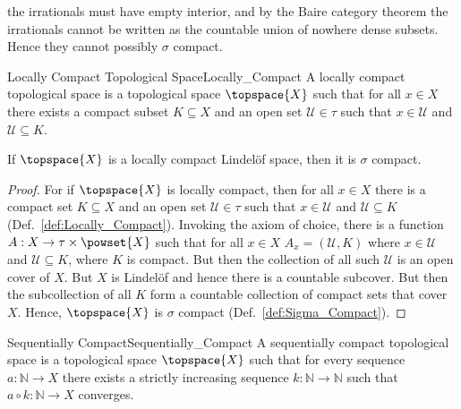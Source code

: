 \documentclass{article}                                                        %
\begin{document}
            the irrationals must have empty interior, and by the Baire category
            theorem the irrationals cannot be written as the countable union of
            nowhere dense subsets. Hence they cannot possibly $\sigma$ compact.
            \begin{fdefinition}{Locally Compact Topological Space}{Locally_Compact}
                A locally compact topological space is a topological space
                $\topspace{X}$ such that for all $x\in{X}$ there exists a compact
                subset $K\subseteq{X}$ and an open set $\mathcal{U}\in\tau$ such
                that $x\in\mathcal{U}$ and $\mathcal{U}\subseteq{K}$.
            \end{fdefinition}
            \begin{theorem}
                \label{thm:Loc_Comp_and_Lindelof_Implies_Sigma_Comp}%
                If $\topspace{X}$ is a locally compact Lindel\"{o}f space, then it
                is $\sigma$ compact.
            \end{theorem}
            \begin{proof}
                For if $\topspace{X}$ is locally compact, then for all $x\in{X}$
                there is a compact set $K\subseteq{X}$ and an open set
                $\mathcal{U}\in\tau$ such that $x\in\mathcal{U}$ and
                $\mathcal{U}\subseteq{K}$ (Def.~\ref{def:Locally_Compact}).
                Invoking the axiom of choice, there is a function
                $A:X\rightarrow\tau\times\powset{X}$ such that for all $x\in{X}$
                $A_{x}=(\mathcal{U},K)$ where $x\in\mathcal{U}$ and
                $\mathcal{U}\subseteq{K}$, where $K$ is compact. But then the
                collection of all such $\mathcal{U}$ is an open cover of $X$. But
                $X$ is Lindel\"{o}f and hence there is a countable subcover. But
                then the subcollection of all $K$ form a countable collection of
                compact sets that cover $X$. Hence, $\topspace{X}$ is $\sigma$
                compact (Def.~\ref{def:Sigma_Compact}).
            \end{proof}
            \begin{fdefinition}{Sequentially Compact}{Sequentially_Compact}
                A sequentially compact topological space is a topological space
                $\topspace{X}$ such that for every sequence
                $a:\mathbb{N}\rightarrow{X}$ there exists a strictly increasing
                sequence $k:\mathbb{N}\rightarrow\mathbb{N}$ such that
                $a\circ{k}:\mathbb{N}\rightarrow{X}$ converges.
            \end{fdefinition}
\end{document}
